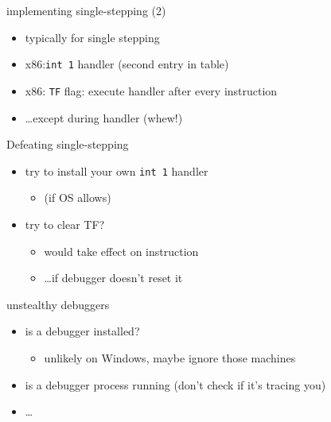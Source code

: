 \begin{frame}[fragile,label=implSingleStepB]{implementing single-stepping (2)}
\lstset{language=myasm,style=small}
    \begin{itemize}
    \item typically  for single stepping
    \item x86:{\tt int 1} handler (second entry in table)
    \item x86: {\tt TF} flag: execute handler after every instruction
    \item \ldots except during handler (whew!)
    \end{itemize}
\end{frame}

\begin{frame}[fragile,label=defeatSingleStep]{Defeating single-stepping}
    \begin{itemize}
    \item try to install your own {\tt int 1} handler
        \begin{itemize}
        \item (if OS allows)
        \end{itemize}
    \item try to clear TF?
        \begin{itemize}
        \item would take effect on  instruction
        \item \ldots if debugger doesn't reset it
        \end{itemize}
    \end{itemize}
\end{frame}


\begin{frame}[fragile,label=unstealthyDebuggers]{unstealthy debuggers}
    \begin{itemize}
    \item is a debugger installed?
        \begin{itemize}
        \item unlikely on Windows, maybe ignore those machines
        \end{itemize}
    \item is a debugger process running (don't check if it's tracing you)
    \item \ldots
    \end{itemize}
\end{frame}

